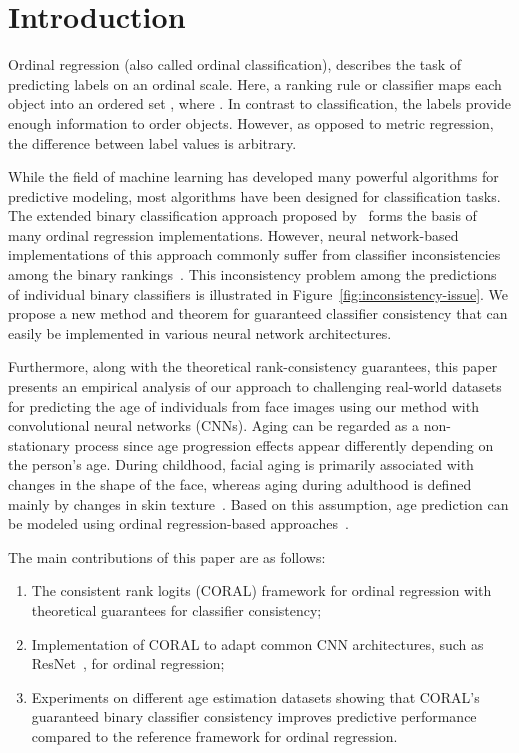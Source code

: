 \documentclass[times,twocolumn,final,authoryear]{elsarticle}
\begin{document}
\section{Introduction}
\label{sec:introduction}

Ordinal regression (also called ordinal classification), describes the task of predicting labels on an ordinal scale. Here, a ranking rule or classifier  maps each object  into an ordered set , where . In contrast to classification, the labels provide enough information to order objects. However, as opposed to metric regression, the difference between label values is arbitrary.

While the field of machine learning has developed many powerful algorithms for predictive modeling, most algorithms have been designed for classification tasks. The extended binary classification approach proposed by~\cite{li2007ordinal} forms the basis of many ordinal regression implementations. However, neural network-based implementations of this approach commonly suffer from classifier inconsistencies among the binary rankings~\citep{niu2016ordinal}.
This inconsistency problem among the predictions of individual binary classifiers is illustrated in Figure~\ref{fig:inconsistency-issue}.
We propose a new method and theorem for guaranteed classifier consistency that can easily be implemented in various neural network architectures.


Furthermore, along with the theoretical rank-consistency guarantees, this paper presents an empirical analysis of our approach to challenging real-world datasets for predicting the age of individuals from face images using our method with convolutional neural networks (CNNs). Aging can be regarded as a non-stationary process since age progression effects appear differently depending on the person's age. During childhood, facial aging is primarily associated with changes in the shape of the face, whereas aging during adulthood is defined mainly by changes in skin texture~\citep{ramanathan2009age,niu2016ordinal}. Based on this assumption, age prediction can be modeled using ordinal regression-based approaches~\citep{yang2010ranking,chang2011ordinal,cao2012human,li2012learning}.

The main contributions of this paper are as follows:

\begin{enumerate}
    \item The consistent rank logits (CORAL) framework for ordinal regression with theoretical guarantees for classifier consistency;
    \item Implementation of CORAL to adapt common CNN architectures, such as ResNet~\citep{he2016deep}, for ordinal regression;
    \item Experiments on different age estimation datasets showing that CORAL's guaranteed binary classifier consistency improves predictive performance compared to the reference framework for ordinal regression.
\end{enumerate}
\end{document}
